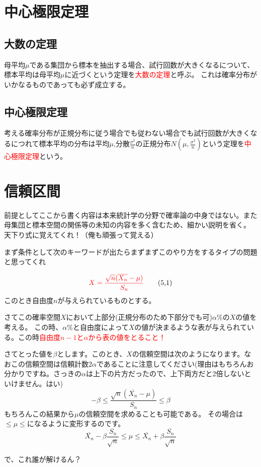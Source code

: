\documentclass[a4paper,10pt]{jarticle}
\begin{document}
\section{中心極限定理}
\subsection{大数の定理}
母平均$\mu$である集団から標本を抽出する場合、試行回数が大きくなるについて、標本平均は母平均$\mu$に近づくという定理を\textcolor{red}{大数の定理}と呼ぶ。
これは確率分布がいかなるものであっても必ず成立する。
\subsection{中心極限定理}
考える確率分布が正規分布に従う場合でも従わない場合でも試行回数が大きくなるにつれて標本平均の分布は平均$\mu$,分散$\frac{\sigma^2}{n}$の正規分布$N(\mu,\frac{\sigma^2}{n})$という定理を\textcolor{red}{中心極限定理}という。
\section{信頼区間}
前提としてここから書く内容は本来統計学の分野で確率論の中身ではない。また母集団と標本空間の関係等の未知の内容を多く含むため、細かい説明を省く。
天下り式に覚えてくれ！（俺も頑張って覚える）

まず条件として次のキーワードが出たらまずまずこのやり方をするタイプの問題と思ってくれ

\begin{equation}
    \textcolor{red}{X=\frac{\sqrt{n}(\overline{X_n}-\mu)}{S_n}}\tag{5,1}
\end{equation}
このとき自由度$n$が与えられているものとする。

さてこの確率空間$X$において上部分(正規分布のため下部分でも可)$\alpha$\%の$X$の値を考える。
この時、$\alpha$\%と自由度によって$X$の値が決まるような表が与えられている。この時\textcolor{red}{自由度$n-1$と$\alpha$から表の値をとること！}

さてとった値を$\beta$とします。このとき、$X$の信頼空間は次のようになります。なおこの信頼空間は信頼計数$2\alpha$であることに注意してください(理由はもちろんお分かりですね。さっきの$\alpha$は上下の片方だったので、上下両方だと2倍しないといけません。はい)
\begin{equation}
    -\beta \leq\frac{\sqrt{n}(\overline{X_n}-\mu)}{S_n}\leq\beta\tag{5,2}
\end{equation}
もちろんこの結果から$\mu$の信頼空間を求めることも可能である。
その場合は$\leq\mu\leq$になるように変形するのです。
\begin{equation}
    \overline{X_n}-\beta \frac{S_n}{\sqrt{n}}\leq\mu\leq\overline{X_n}+\beta \frac{S_n}{\sqrt{n}}\tag{5,3}
\end{equation}

で、これ誰が解けるん？
\end{document}
